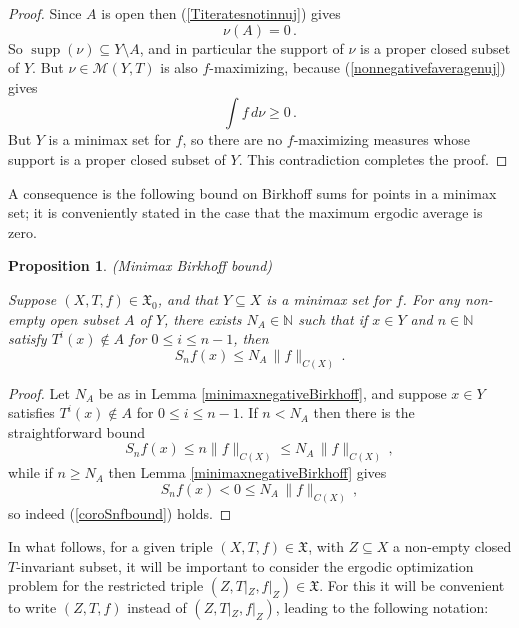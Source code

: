 \documentclass[reqno,11pt]{amsart}
\newtheorem{prop}[thm]{Proposition}
\theoremstyle{definition}
\theoremstyle{remark}
\theoremstyle{remark}
\def \N {\mathbb N}
\def\m{\mathcal M}
\newcommand{\supp}{\operatorname{supp}}
\def\X{\mathfrak{X}}
\numberwithin{equation}{section}
\begin{document}
\begin{proof}
Since $A$ is open then (\ref{Titeratesnotinnuj}) gives
\begin{equation}\label{Titeratesnotinnu}
\nu(A)=0 \,.
\end{equation}
So $\supp(\nu)\subseteq Y\setminus A$, and in particular the support of $\nu$ is a proper closed subset of $Y$.
But $\nu\in\m(Y,T)$ is also $f$-maximizing, because
(\ref{nonnegativefaveragenuj}) gives
\begin{equation}\label{nonnegativefaveragenu}
\int f\, d\nu \ge0\,.
\end{equation}
But $Y$ is a minimax set for $f$, so there are no $f$-maximizing measures whose support is
 a proper closed subset of $Y$.
This contradiction completes the proof.
\end{proof}

A consequence is the following bound on Birkhoff sums for points in a minimax set; it is conveniently stated in the case that the maximum ergodic average is zero.  

\begin{prop}\label{minimaxnegativeBirkhoffcor} (Minimax Birkhoff bound)


\noindent
Suppose $(X,T,f)\in\X_0$, and that $Y\subseteq X$ is a minimax set for $f$.
For any non-empty open subset $A$ of $Y$, there exists $N_A\in\N$ such that
if $x\in Y$ and $n\in\N$ satisfy $T^i(x)\notin A$ for $0\le i\le n-1$, then
\begin{equation}\label{coroSnfbound}
S_nf(x) \le N_A\, \|f\|_{C(X)}\,.
\end{equation}
\end{prop}
\begin{proof}
Let $N_A$ be as in Lemma \ref{minimaxnegativeBirkhoff}, and
suppose $x\in Y$ satisfies $T^i(x)\notin A$ for $0\le i\le n-1$.
If $n< N_A$ then there is the straightforward bound
$$
S_nf(x) \le n \|f\|_{C(X)} \le N_A\, \|f\|_{C(X)}\,,
$$
while
if $n\ge N_A$ then Lemma \ref{minimaxnegativeBirkhoff} gives
$$S_nf(x)<0 \le N_A\, \|f\|_{C(X)}\,,$$
so indeed  (\ref{coroSnfbound}) holds.
\end{proof}





In what follows, for a given triple  $(X,T,f)\in\X$, 
with $Z\subseteq X$ a non-empty closed $T$-invariant subset,
it will be important to consider the ergodic optimization problem for the
restricted triple
$(Z,T|_Z,f|_Z)\in\X$. 
For this it will be convenient to write
$(Z,T,f)$ instead of $(Z,T|_Z,f|_Z)$, leading to the following notation:
\end{document}
